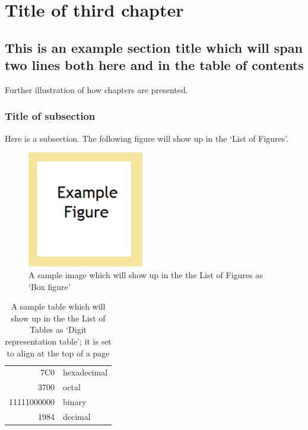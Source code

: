 \chapter{Title of third chapter}
	\label{CH_03}


\section{This is an example section title which will span two lines both here and in the table of contents}
Further illustration of how chapters are presented.


\subsection{Title of subsection}
Here is a subsection.  The following figure will show up in the `List of Figures'.

\begin{figure}[h] %
	\centering
	\includegraphics[width=2.0in]{Figures/figure1}
	\caption[Box figure]{A sample image which will show up in the the List of Figures as `Box figure'}
\end{figure}
\begin{table}[t]
	\centering
	\begin{tabular}{|r|l|}
	\hline
	7C0 & hexadecimal \\
	3700 & octal \\ \cline{2-2}
	11111000000 & binary \\
	\hline \hline
	1984 & decimal \\
	\hline
	\end{tabular}
	\caption[Digit representation]{A sample table which will show up in the the List of Tables as `Digit representation table'; it is set to align at the top of a page}
\end{table}

